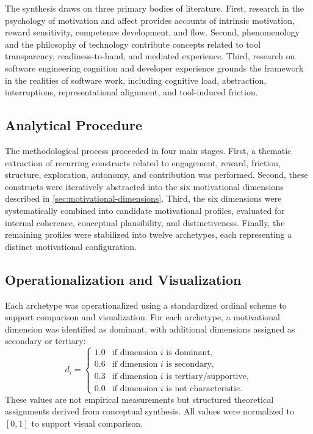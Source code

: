 \documentclass[12pt]{elsarticle}
\begin{document}
The synthesis draws on three primary bodies of literature. First, 
research in the psychology of motivation and affect provides accounts of 
intrinsic motivation, reward sensitivity, competence development, and 
flow. Second, phenomenology and the philosophy of technology contribute 
concepts related to tool transparency, readiness-to-hand, and mediated 
experience. Third, research on software engineering cognition and 
developer experience grounds the framework in the realities of software 
work, including cognitive load, abstraction, interruptions, 
representational alignment, and tool-induced friction.

\subsection{Analytical Procedure}

The methodological process proceeded in four main stages. First, a 
thematic extraction of recurring constructs related to engagement, 
reward, friction, structure, exploration, autonomy, and contribution 
was performed. Second, these constructs were iteratively abstracted into 
the six motivational dimensions described in \cref{sec:motivational-dimensions}. 
Third, the six dimensions were systematically combined into candidate 
motivational profiles, evaluated for internal coherence, conceptual 
plausibility, and distinctiveness. Finally, the remaining profiles were 
stabilized into twelve archetypes, each representing a distinct 
motivational configuration.

\subsection{Operationalization and Visualization}

Each archetype was operationalized using a standardized ordinal scheme 
to support comparison and visualization. For each archetype, a 
motivational dimension was identified as dominant, with additional 
dimensions assigned as secondary or tertiary:
%
\begin{equation}
d_i = \begin{cases}
1.0 & \text{if dimension } i \text{ is dominant,} \\
0.6 & \text{if dimension } i \text{ is secondary,} \\
0.3 & \text{if dimension } i \text{ is tertiary/supportive,} \\
0.0 & \text{if dimension } i \text{ is not characteristic.}
\end{cases}
\label{eq:ordinal}
\end{equation}
%
These values are not empirical measurements but structured theoretical 
assignments derived from conceptual synthesis. All values were normalized 
to $[0,1]$ to support visual comparison.
\end{document}
